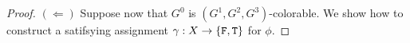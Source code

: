 \begin{proof}
  $(\Leftarrow)$
  Suppose now that $G^{0}$ is $(G^{1}, G^{2}, G^{3})$-colorable.
  We show how to construct a satifsying assignment
  $\gamma : X \to \{\texttt{F}, \texttt{T}\}$ for $\phi$.


  

  


\end{proof}
